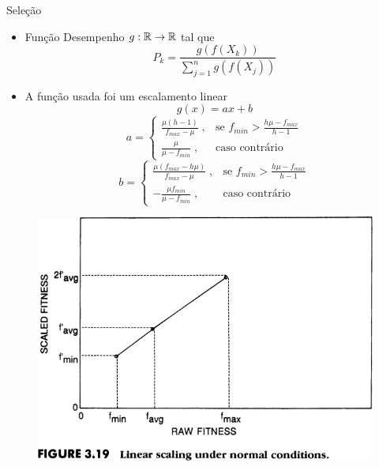 \newcommand{\fmin}{f_{min}}
\newcommand{\fmax}{f_{max}}

\begin{frame}{Seleção}
  \begin{itemize}
    \item Função Desempenho $g : \mathbb{R} \rightarrow \mathbb{R}$ tal que
          $$ P_k = \frac{g(f(X_k))}{\sum_{j = 1}^n g(f(X_j))} $$
    \item A função usada foi um escalamento linear $$ g(x) = ax + b $$
          $$
            a =
            \begin{cases}
              \frac{\mu (h - 1)}{\fmax - \mu} \;, & \text{se } \fmin > \frac{h\mu - \fmax}{h - 1} \\
              \frac{\mu}{\mu - \fmin}         \;, & \text{caso contrário}
            \end{cases}
          $$
          $$
            b =
            \begin{cases}
              \frac{\mu (\fmax - h\mu)}{\fmax - \mu} \;, & \text{se } \fmin > \frac{h\mu - \fmax}{h - 1} \\
              - \frac{\mu\fmin}{\mu - \fmin}         \;, & \text{caso contrário}
            \end{cases}
          $$
  \end{itemize}
\end{frame}

\begin{frame}
  \begin{figure}
    \centering
    \includegraphics[height=\textheight]{imagens/linear_scaling.png}
  \end{figure}
\end{frame}

